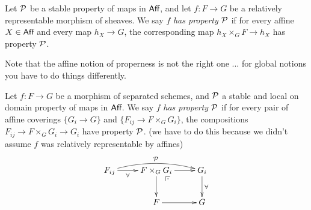 \begin{definition}
 Let $\P$ be a stable property of maps in $\aff$, and let $f:F\to G$ be a relatively representable morphism of sheaves. We say $f$ \emph{has property $\P$} if for every affine $X\in \aff$ and every map $h_X\to G$, the corresponding map $h_X\times_G F\to h_X$ has property $\P$.
\end{definition}
\begin{remark}
 Note that the affine notion of properness is not the right one ... for global notions you have to do things differently.
\end{remark}
\begin{definition}
 Let $f:F\to G$ be a morphism of separated schemes, and $\P$ a stable and local on domain property of maps in $\aff$. We say $f$ \emph{has property $\P$} if for every pair of affine coverings $\{G_i\to G\}$ and $\{F_{ij}\to F\times_G G_i\}$, the compositions $F_{ij}\to F\times_G G_i\to G_i$ have property $\P$. (we have to do this because we didn't assume $f$ was relatively representable by affines) 
 \[\xymatrix{
  F_{ij}\ar[r]_<>(.5)\forall \ar@/^2ex/[rr]^\P
  & F\times_G G_i\ar[r] \ar[d] \ar@{}[dr]|(.25){\pb}
  & G_i\ar[d]^\forall\\
  & F \ar[r] & G
 }\]
\end{definition}

